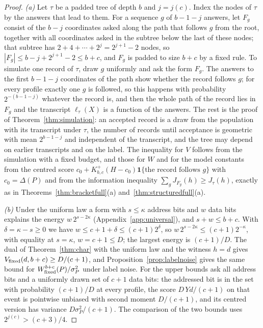 \begin{proof}
\emph{(a)} Let $\tau$ be a padded tree of depth $b$ and $j=j(c)$. Index the nodes of $\tau$ by the answers that lead to them. For a sequence $g$ of $b-1-j$ answers, let $F_g$ consist of the $b-j$ coordinates asked along the path that follows $g$ from the root, together with all coordinates asked in the subtree below the last of these nodes; that subtree has $2+4+\cdots+2^{j}=2^{j+1}-2$ nodes, so $|F_g|\le b-j+2^{j+1}-2\le b+c$, and $F_g$ is padded to size $b+c$ by a fixed rule. To simulate one record of $\tau$, draw $g$ uniformly and ask the form $F_g$. The answers to the first $b-1-j$ coordinates of the path show whether the record follows $g$; for every profile exactly one $g$ is followed, so this happens with probability $2^{-(b-1-j)}$ whatever the record is, and then the whole path of the record lies in $F_g$ and the transcript $\ell_\tau(X)$ is a function of the answers. The rest is the proof of Theorem~\ref{thm:simulation}: an accepted record is a draw from the population with its transcript under $\tau$, the number of records until acceptance is geometric with mean $2^{b-1-j}$ and independent of the transcript, and the tree may depend on earlier transcripts and on the label. The inequality for $V$ follows from the simulation with a fixed budget, and those for $W$ and for the model constants from the centred score $c_0+K^{+}_{b,c}(H-c_0)\mathbf 1\{\text{the record follows }g\}$ with $c_0=\Delta(P)$ and from the information inequality $\sum_gJ_{F_g}(h)\ge J_\tau(h)$, exactly as in Theorems~\ref{thm:bracketfull}(a) and~\ref{thm:structuredfull}(a).

\emph{(b)} Under the uniform law a form with $s\le\kappa$ address bits and $w$ data bits explains the energy $w\,2^{s-2\kappa}$ (Appendix~\ref{app:universal}), and $s+w\le b+c$. With $\delta=\kappa-s\ge0$ we have $w\le c+1+\delta\le(c+1)2^{\delta}$, so $w\,2^{s-2\kappa}\le(c+1)2^{-\kappa}$, with equality at $s=\kappa$, $w=c+1\le D$; the largest energy is $(c+1)/D$. The dual of Theorem~\ref{thm:char} with the uniform law and the witness $h=d$ gives $V_{\rm fixed}(d,b+c)\ge D/(c+1)$, and Proposition~\ref{prop:labelnoise} gives the same bound for $W^{b+c}_{\rm fixed}(P)/\sigma_P^2$ under label noise. For the upper bounds ask all address bits and a uniformly drawn set of $c+1$ data bits: the addressed bit is in the set with probability $(c+1)/D$ at every profile, the score $D\,Yd/(c+1)$ on that event is pointwise unbiased with second moment $D/(c+1)$, and its centred version has variance $D\sigma_P^2/(c+1)$. The comparison of the two bounds uses $2^{j(c)}>(c+3)/4$.


\end{proof}
